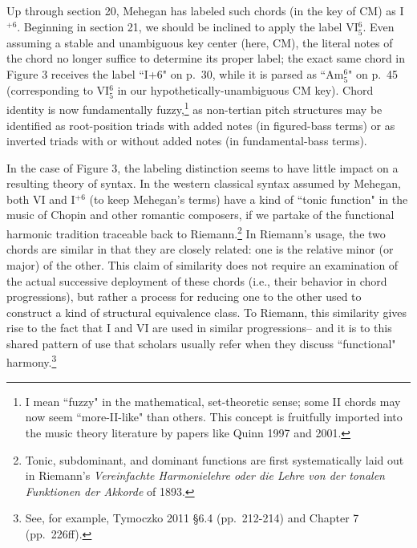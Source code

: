 Up through section 20, Mehegan has labeled such chords (in the key of CM) as I$^{+6}$.  Beginning in section 21, we should be inclined to apply the label VI$^6_5$.  Even assuming a stable and unambiguous key center (here, CM), the literal notes of the chord no longer suffice to determine its proper label; the exact same chord in Figure 3 receives the label ``I+6" on p.\ 30, while it is parsed as ``Am$^6_5$" on p.\ 45 (corresponding to VI$^6_5$ in our hypothetically-unambiguous CM key).  Chord identity is now fundamentally fuzzy,\footnote{I mean ``fuzzy" in the mathematical, set-theoretic sense; some II chords may now seem ``more-II-like" than others.  This concept is fruitfully imported into the music theory literature by papers like Quinn 1997 and 2001.} as non-tertian pitch structures may be identified as root-position triads with added notes (in figured-bass terms) or as inverted triads with or without added notes (in fundamental-bass terms).

In the case of Figure 3, the labeling distinction seems to have little impact on a resulting theory of syntax.  In the western classical syntax assumed by Mehegan, both VI and I$^{+6}$ (to keep Mehegan's terms) have a kind of ``tonic function" in the music of Chopin and other romantic composers, if we partake of the functional harmonic tradition traceable back to Riemann.\footnote{Tonic, subdominant, and dominant functions are first systematically laid out in Riemann's \emph{Vereinfachte Harmonielehre oder die Lehre von der tonalen Funktionen der Akkorde} of 1893.}  In Riemann's usage, the two chords are similar in that they are closely related: one is the relative minor (or major) of the other.  This claim of similarity does not require an examination of the actual successive deployment of these chords (i.e., their behavior in chord progressions), but rather a process for reducing one to the other used to construct a kind of structural equivalence class.  To Riemann, this similarity gives rise to the fact that I and VI are used in similar progressions-- and it is to this shared pattern of use that scholars usually refer when they discuss ``functional" harmony.\footnote{See, for example, Tymoczko 2011 \S 6.4 (pp.\ 212-214) and Chapter 7 (pp.\ 226ff).}  

